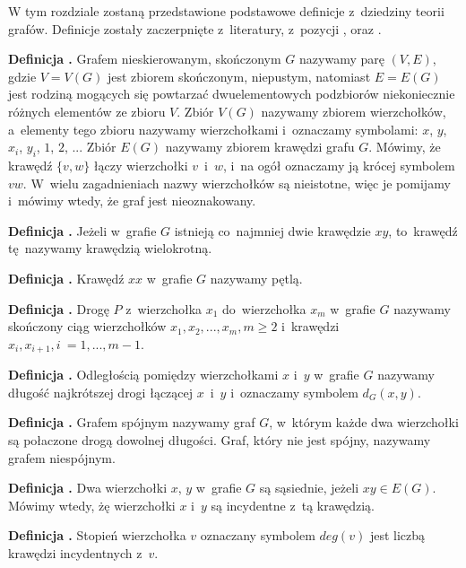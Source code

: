 W tym rozdziale zostaną przedstawione podstawowe definicje z~dziedziny teorii grafów.
Definicje zostały zaczerpnięte z~literatury, z~pozycji \cite{Wloch2008}, \cite{Wilson2012} oraz \cite{Wojciechwoski2013}.

\noindent
\textbf{Definicja .}
\incrementdefinitionIndex
Grafem nieskierowanym, skończonym $G$ nazywamy parę $(V,E)$, gdzie $V = V(G)$ jest zbiorem skończonym, niepustym,
natomiast $E = E(G)$ jest rodziną mogących się powtarzać dwuelementowych podzbiorów niekoniecznie różnych elementów ze zbioru $V$.
Zbiór $V(G)$ nazywamy zbiorem wierzchołków, a~elementy tego zbioru nazywamy wierzchołkami i~oznaczamy symbolami:
$x$, $y$, $x_i$, $y_i$, $1$, $2$, ... Zbiór $E(G)$ nazywamy zbiorem krawędzi grafu $G$.
Mówimy, że krawędź $\{v, w\}$ łączy wierzchołki $v$~i~$w$, i~na ogół oznaczamy ją krócej symbolem $vw$.
W~wielu zagadnieniach nazwy wierzchołków są nieistotne, więc je pomijamy i~mówimy wtedy, że graf jest nieoznakowany.

\noindent
\textbf{Definicja .}
\incrementdefinitionIndex
Jeżeli w~grafie $G$ istnieją co~najmniej dwie krawędzie $xy$, to~krawędź tę~nazywamy krawędzią wielokrotną.

\noindent
\textbf{Definicja .}
\incrementdefinitionIndex
Krawędź $xx$ w~grafie $G$ nazywamy pętlą.

\noindent
\textbf{Definicja .}
\incrementdefinitionIndex
Drogę $P$ z~wierzchołka $x_1$ do~wierzchołka $x_m$ w~grafie $G$ nazywamy skończony ciąg wierzchołków
$x_1, x_2, ..., x_m, m \geqslant 2$ i~krawędzi ${x_i, x_{i + 1}}, i~= 1, ..., m-1$.

\noindent
\textbf{Definicja .}
\incrementdefinitionIndex
Odległością pomiędzy wierzchołkami $x$ i~$y$ w~grafie $G$ nazywamy długość najkrótszej drogi łączącej $x$~i~$y$
i~oznaczamy symbolem $d_G(x,y)$.

\noindent
\textbf{Definicja .}
\incrementdefinitionIndex
Grafem spójnym nazywamy graf $G$, w~którym każde dwa wierzchołki są połaczone drogą dowolnej długości.
Graf, który nie jest spójny, nazywamy grafem niespójnym.

\noindent
\textbf{Definicja .}
\incrementdefinitionIndex
Dwa wierzchołki $x$, $y$ w~grafie $G$ są sąsiednie, jeżeli $xy \in E(G)$.
Mówimy wtedy, żę wierzchołki $x$ i~$y$ są incydentne z~tą krawędzią.

\noindent
\textbf{Definicja .}
\incrementdefinitionIndex
Stopień wierzchołka $v$ oznaczany symbolem $deg(v)$ jest liczbą krawędzi incydentnych z~$v$.

